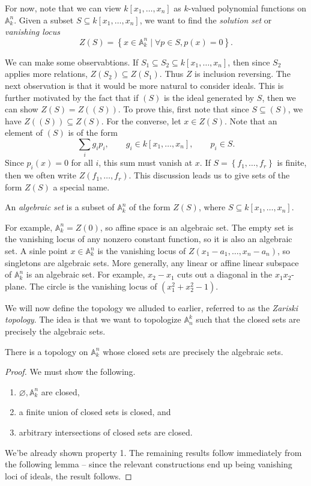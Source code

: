 For now, note that we can view $k[x_1, \ldots ,x_n]$ as $k$-valued polynomial functions on $\mathbb{A} _k^n$. Given a subset $S\subseteq k[x_1, \ldots ,x_n]$, we want to find the \emph{solution set} or \emph{vanishing locus}
\[
	Z(S) = \left\{ x\in \mathbb{A} _k^n \mid \forall p\in S, p(x)=0 \right\} 
.\]

We can make some observabtions. If $S_1 \subseteq S_2 \subseteq k[x_1, \ldots ,x_n]$, then since $S_2$ applies more relations, $Z(S_2)\subseteq Z(S_1)$. Thus $Z$ is inclusion reversing. The next observation is that it would be more natural to consider ideals. This is further motivated by the fact that if $(S)$ is the ideal generated by $S$, then we can show $Z(S) = Z((S))$. To prove this, first note that since $S\subseteq (S)$, we have $Z((S))\subseteq Z(S)$. For the converse, let $x\in Z(S)$. Note that an element of $(S)$ is of the form
\[
	\sum_{i} g_ip_i,\qquad g_i\in k[x_1, \ldots ,x_n],\qquad p_i\in S
.\]
Since $p_i(x)=0$ for all $i$, this sum must vanish at $x$. If $S=\left\{ f_1, \ldots ,f_r \right\} $ is finite, then we often write $Z(f_1, \ldots ,f_r)$. This discussion leads us to give sets of the form $Z(S)$ a special name.

\begin{definition}\label{dfn:1.1.2}
	An \emph{algebraic set} is a subset of $ \mathbb{A} ^n_k$ of the form $Z(S)$, where $S\subseteq k[x_1, \ldots ,x_n]$.
\end{definition}

For example, $\mathbb{A} ^n_k = Z(0)$, so affine space is an algebraic set. The empty set is the vanishing locus of any nonzero constant function, so it is also an algebraic set. A sinle point $x\in\mathbb{A} _k^n$ is the vanishing locus of $Z(x_1 - a_1, \ldots ,x_n - a_n)$, so singletons are algebraic sets. More generally, any linear or affine linear subspace of $\mathbb{A} ^n_k$ is an algebraic set. For example, $x_2 - x_1$ cuts out a diagonal in the $x_1x_2$-plane. The circle is the vanishing locus of $(x_1^2 + x_2^2 - 1)$.


We will now define the topology we alluded to earlier, referred to as the \emph{Zariski topology}. The idea is that we want to topologize $\mathbb{A} _n^k$ such that the closed sets are precisely the algebraic sets.

\begin{proposition}\label{prp:1.1.3}
	There is a topology on $\mathbb{A} _k^n$ whose closed sets are precisely the algebraic sets.
\end{proposition}
\begin{proof}
	We must show the following.
	\begin{enumerate}
		\item $\varnothing ,\mathbb{A}^n_k$ are closed,
		\item a finite union of closed sets is closed, and
		\item arbitrary intersections of closed sets are closed.
	\end{enumerate}
	We'be already shown property 1. The remaining results follow immediately from the following lemma -- since the relevant constructions end up being vanishing loci of ideals, the result follows.
\end{proof}

